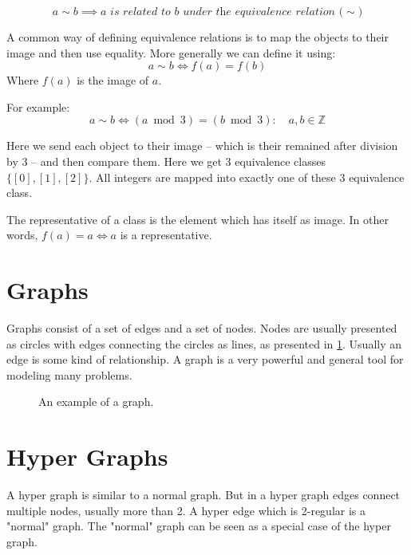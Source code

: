 \documentclass{report}
\begin{document}
$$
  a \sim b \implies \textit{$a$ is related to $b$ under the equivalence relation ($\sim$)}
$$

A common way of defining equivalence relations is to map the objects to their image and then use equality.
More generally we can define it using:
$$
  a \sim b \iff f(a) = f(b)
$$
Where $f(a)$ is the image of $a$.

For example:
$$
  a \sim b \iff (a \bmod 3) = (b \bmod 3) : \quad a, b \in \mathds{Z}
$$

Here we send each object to their image -- which is their remained after division by 3 -- and then compare them.
Here we get 3 equivalence classes $\{[0], [1], [2]\}$. All integers are mapped into exactly one of these 3 equivalence class.

The representative of a class is the element which has itself as image. In other words, $f(a) = a \iff a$ is a representative.
\cite[Section 7.3]{sourceArmen} \cite[Section 1.2]{sourceAATA}

\section{Graphs}
Graphs consist of a set of edges and a set of nodes.
Nodes are usually presented as circles with edges connecting the circles as lines, as presented in \ref{figGraphExample}.
Usually an edge is some kind of relationship.
A graph is a very powerful and general tool for modeling many problems.

\begin{center}
\begin{figure}[h]
\centering
{}
  \caption{An example of a graph.}
  \label{figGraphExample}
\end{figure}
\end{center}

\cite[Chapter 1]{sourceDiestel}
\cite[Chapter 1]{sourceGWA}
\cite[Section 9.1]{sourceArmen}


\section{Hyper Graphs}
A hyper graph is similar to a normal graph.
But in a hyper graph edges connect multiple nodes, usually more than 2.
A hyper edge which is 2-regular is a "normal" graph.
The "normal" graph can be seen as a special case of the hyper graph.
\end{document}
